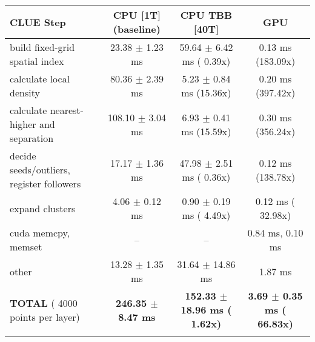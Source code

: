     \begin{tabular}{l|c|c|c}
    \hline
    CLUE Step                                 & CPU [1T] (baseline)         & CPU TBB [40T]                         & GPU                       \\ \hline
    build fixed-grid spatial index            &  23.38 $\pm$  1.23 ms       &  59.64 $\pm$  6.42 ms ( 0.39x)        &   0.13 ms (183.09x)       \\
    calculate local density                   &  80.36 $\pm$  2.39 ms       &   5.23 $\pm$  0.84 ms (15.36x)        &   0.20 ms (397.42x)       \\
    calculate nearest-higher and separation   & 108.10 $\pm$  3.04 ms       &   6.93 $\pm$  0.41 ms (15.59x)        &   0.30 ms (356.24x)       \\
    decide seeds/outliers, register followers &  17.17 $\pm$  1.36 ms       &  47.98 $\pm$  2.51 ms ( 0.36x)        &   0.12 ms (138.78x)       \\
    expand clusters                           &   4.06 $\pm$  0.12 ms       &   0.90 $\pm$  0.19 ms ( 4.49x)        &   0.12 ms ( 32.98x)       \\ \hline
    cuda memcpy, memset                       & --                          & --                                    &   0.84 ms,   0.10 ms      \\ 
    other                                     &  13.28 $\pm$  1.35 ms       &  31.64 $\pm$ 14.86 ms                 &   1.87 ms                 \\ \hline
    \textbf{TOTAL} ( 4000 points per layer)   & \textbf{246.35 $\pm$  8.47 ms} & \textbf{152.33 $\pm$ 18.96 ms ( 1.62x)} & \textbf{  3.69 $\pm$  0.35 ms ( 66.83x)}  \\
    \hline
    \multicolumn{4}{c}{} 
    \end{tabular}
    \linebreak


